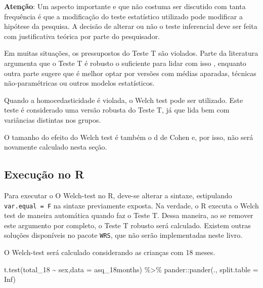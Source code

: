 \documentclass[
]{book}
\newenvironment{Shaded}{\begin{snugshade}}{\end{snugshade}}
\newcommand{\AttributeTok}[1]{\textcolor[rgb]{0.77,0.63,0.00}{#1}}
\newcommand{\ConstantTok}[1]{\textcolor[rgb]{0.00,0.00,0.00}{#1}}
\newcommand{\FunctionTok}[1]{\textcolor[rgb]{0.00,0.00,0.00}{#1}}
\newcommand{\NormalTok}[1]{#1}
\newcommand{\SpecialCharTok}[1]{\textcolor[rgb]{0.00,0.00,0.00}{#1}}
\begin{document}
\textbf{Atenção}: Um aspecto importante e que não costuma ser discutido com tanta frequência é que a modificação do teste estatístico utilizado pode modificar a hipótese da pesquisa. A decisão de alterar ou não o teste inferencial deve ser feita com justificativa teórica por parte do pesquisador.

Em muitas situações, os pressupostos do Teste T são violados. Parte da literatura argumenta que o Teste T é robusto o suficiente para lidar com isso \citep{Lumley2002}, enquanto outra parte sugere que é melhor optar por versões com médias aparadas, técnicas não-paramétricas \citep{Field2017} ou outros modelos estatísticos.

Quando a homocedasticidade é violada, o Welch test pode ser utilizado. Este teste é considerado uma versão robusta do Teste T, já que lida bem com variâncias distintas nos grupos.

O tamanho do efeito do Welch test é também o d de Cohen e, por isso, não será novamente calculado nesta seção.

\hypertarget{execuuxe7uxe3o-no-r-4}{%
\subsection{Execução no R}\label{execuuxe7uxe3o-no-r-4}}

Para executar o O Welch-test no R, deve-se alterar a sintaxe, estipulando \texttt{var.equal\ =\ F} na sintaxe previamente exposta. Na verdade, o R executa o Welch test de maneira automática quando faz o Teste T. Dessa maneira, ao se remover este argumento por completo, o Teste T robusto será calculado. Existem outras soluções disponíveis no pacote \texttt{WRS}, que não serão implementadas neste livro.

O Welch-test será calculado considerando as crianças com 18 meses.

\begin{Shaded}
\begin{Highlighting}[]
\FunctionTok{t.test}\NormalTok{(total\_18 }\SpecialCharTok{\textasciitilde{}}\NormalTok{ sex,}\AttributeTok{data =}\NormalTok{ asq\_18months) }\SpecialCharTok{\%\textgreater{}\%}\NormalTok{ pander}\SpecialCharTok{::}\FunctionTok{pander}\NormalTok{(., }\AttributeTok{split.table =} \ConstantTok{Inf}\NormalTok{)}
\end{Highlighting}
\end{Shaded}
\end{document}
